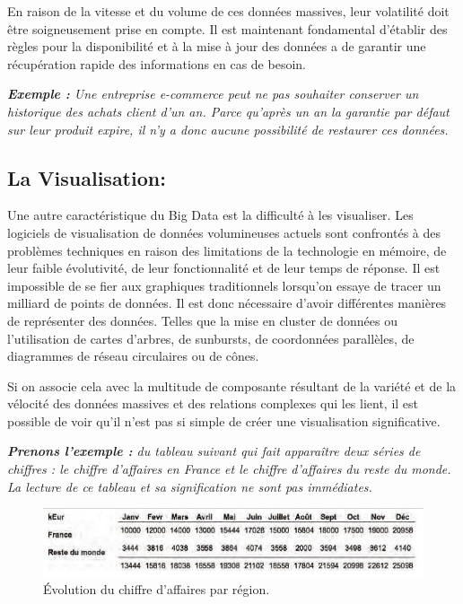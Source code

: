 En raison de la vitesse et du volume de ces données massives, leur volatilité doit être soigneusement prise en compte. Il est maintenant fondamental d'établir des règles pour la disponibilité et à la mise à jour des données a de garantir une récupération rapide des informations en cas de besoin.

\textit{\textbf{Exemple :} Une entreprise e-commerce peut ne pas souhaiter conserver un historique des achats client d'un an. Parce qu’après un an la garantie par défaut sur leur produit expire, il n'y a donc aucune possibilité de restaurer ces données.}

\subsection{La Visualisation:}
Une autre caractéristique du Big Data est la difficulté à les visualiser. Les logiciels de visualisation de données volumineuses actuels sont confrontés à des problèmes techniques en raison des limitations de la technologie en mémoire, de leur faible évolutivité, de leur fonctionnalité et de leur temps de réponse. Il est impossible de se fier aux graphiques traditionnels lorsqu’on essaye de tracer un milliard de points de données. Il est donc nécessaire d'avoir différentes manières de représenter des données. Telles que la mise en cluster de données ou l'utilisation de cartes d'arbres, de sunbursts, de coordonnées parallèles, de diagrammes de réseau circulaires ou de cônes. 

Si on associe cela avec la multitude de composante résultant de la variété et de la vélocité des données massives et des relations complexes qui les lient, il est possible de voir qu'il n'est pas si simple de créer une visualisation significative.

\textit{\textbf{Prenons l'exemple :} du tableau suivant qui fait apparaître deux séries de chiffres : le chiffre d'affaires en France et le chiffre d'affaires du reste du monde. La lecture de ce tableau et sa signification ne sont pas immédiates.}

\begin{figure}[h]
 \centering
 \includegraphics[scale=0.8]{img/fig3_}
 \caption{Évolution du chiffre d'affaires par région.}
\end{figure}

